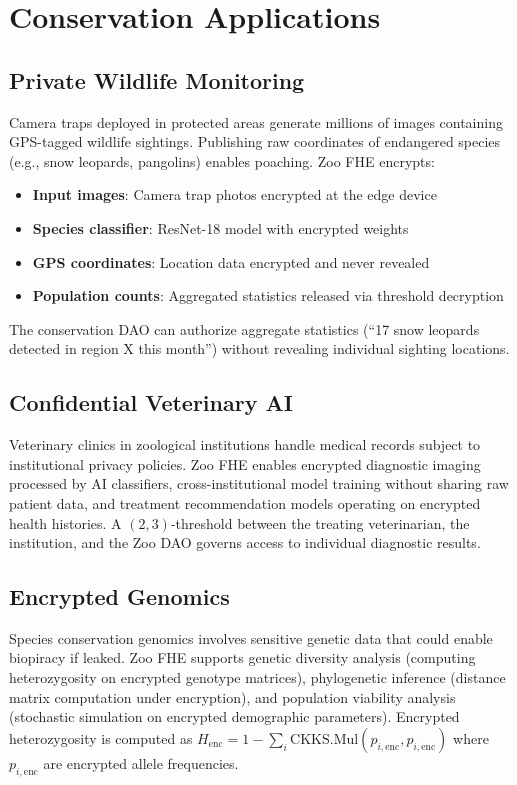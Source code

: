 \section{Conservation Applications}

\label{sec:applications}

\subsection{Private Wildlife Monitoring}

Camera traps deployed in protected areas generate millions of images containing GPS-tagged wildlife sightings. Publishing raw coordinates of endangered species (e.g., snow leopards, pangolins) enables poaching. Zoo FHE encrypts:

\begin{itemize}
    \item \textbf{Input images}: Camera trap photos encrypted at the edge device
    \item \textbf{Species classifier}: ResNet-18 model with encrypted weights
    \item \textbf{GPS coordinates}: Location data encrypted and never revealed
    \item \textbf{Population counts}: Aggregated statistics released via threshold decryption
\end{itemize}

The conservation DAO can authorize aggregate statistics (``17 snow leopards detected in region X this month'') without revealing individual sighting locations.

\subsection{Confidential Veterinary AI}

Veterinary clinics in zoological institutions handle medical records subject to institutional privacy policies. Zoo FHE enables encrypted diagnostic imaging processed by AI classifiers, cross-institutional model training without sharing raw patient data, and treatment recommendation models operating on encrypted health histories. A $(2, 3)$-threshold between the treating veterinarian, the institution, and the Zoo DAO governs access to individual diagnostic results.

\subsection{Encrypted Genomics}

Species conservation genomics involves sensitive genetic data that could enable biopiracy if leaked. Zoo FHE supports genetic diversity analysis (computing heterozygosity on encrypted genotype matrices), phylogenetic inference (distance matrix computation under \CKKS{} encryption), and population viability analysis (stochastic simulation on encrypted demographic parameters). Encrypted heterozygosity is computed as $H_{\text{enc}} = 1 - \sum_{i} \text{CKKS.Mul}(p_{i,\text{enc}}, p_{i,\text{enc}})$ where $p_{i,\text{enc}}$ are encrypted allele frequencies.

